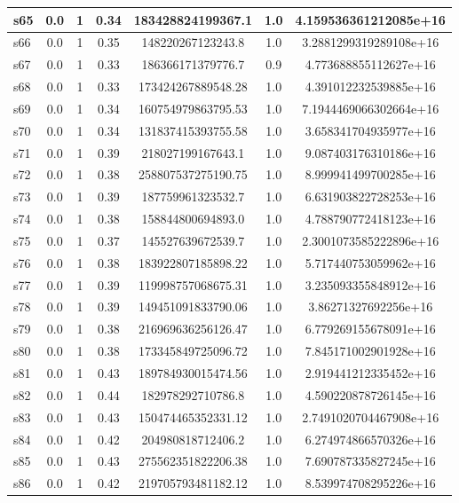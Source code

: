 \documentclass{article}
\begin{document}
\begin{tabular}{|l|c|c|c|c|c|c|}
\hline
s65 &0.0 & 1 & 0.34 & 183428824199367.1 & 1.0 & 4.159536361212085e+16\\
\hline
s66 &0.0 & 1 & 0.35 & 148220267123243.8 & 1.0 & 3.2881299319289108e+16\\
\hline
s67 &0.0 & 1 & 0.33 & 186366171379776.7 & 0.9 & 4.773688855112627e+16\\
\hline
s68 &0.0 & 1 & 0.33 & 173424267889548.28 & 1.0 & 4.391012232539885e+16\\
\hline
s69 &0.0 & 1 & 0.34 & 160754979863795.53 & 1.0 & 7.1944469066302664e+16\\
\hline
s70 &0.0 & 1 & 0.34 & 131837415393755.58 & 1.0 & 3.658341704935977e+16\\
\hline
s71 &0.0 & 1 & 0.39 & 218027199167643.1 & 1.0 & 9.087403176310186e+16\\
\hline
s72 &0.0 & 1 & 0.38 & 258807537275190.75 & 1.0 & 8.999941499700285e+16\\
\hline
s73 &0.0 & 1 & 0.39 & 187759961323532.7 & 1.0 & 6.631903822728253e+16\\
\hline
s74 &0.0 & 1 & 0.38 & 158844800694893.0 & 1.0 & 4.788790772418123e+16\\
\hline
s75 &0.0 & 1 & 0.37 & 145527639672539.7 & 1.0 & 2.3001073585222896e+16\\
\hline
s76 &0.0 & 1 & 0.38 & 183922807185898.22 & 1.0 & 5.717440753059962e+16\\
\hline
s77 &0.0 & 1 & 0.39 & 119998757068675.31 & 1.0 & 3.235093355848912e+16\\
\hline
s78 &0.0 & 1 & 0.39 & 149451091833790.06 & 1.0 & 3.86271327692256e+16\\
\hline
s79 &0.0 & 1 & 0.38 & 216969636256126.47 & 1.0 & 6.779269155678091e+16\\
\hline
s80 &0.0 & 1 & 0.38 & 173345849725096.72 & 1.0 & 7.845171002901928e+16\\
\hline
s81 &0.0 & 1 & 0.43 & 189784930015474.56 & 1.0 & 2.919441212335452e+16\\
\hline
s82 &0.0 & 1 & 0.44 & 182978292710786.8 & 1.0 & 4.590220878726145e+16\\
\hline
s83 &0.0 & 1 & 0.43 & 150474465352331.12 & 1.0 & 2.7491020704467908e+16\\
\hline
s84 &0.0 & 1 & 0.42 & 204980818712406.2 & 1.0 & 6.274974866570326e+16\\
\hline
s85 &0.0 & 1 & 0.43 & 275562351822206.38 & 1.0 & 7.690787335827245e+16\\
\hline
s86 &0.0 & 1 & 0.42 & 219705793481182.12 & 1.0 & 8.539974708295226e+16\\

\end{tabular}
\end{document}
